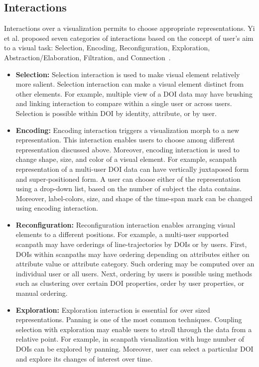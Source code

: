 \subsection{Interactions}
Interactions over a visualization permits to choose appropriate representations. Yi et al. proposed seven categories of interactions based on the concept of user's aim to a visual task: Selection, Encoding, Reconfiguration, Exploration, Abstraction/Elaboration, Filtration, and Connection~\cite{yi2007toward}. 

\begin{itemize}

	\item \textbf{Selection:} Selection interaction is used to make visual element relatively more salient. Selection interaction can make a visual element distinct from other elements. For example, multiple view of a DOI data may have brushing and linking interaction to compare within a single user or across users. Selection is possible within DOI by identity, attribute, or by user.
	
	\item \textbf{Encoding:} Encoding interaction triggers a visualization morph to a new representation. This interaction enables users to choose among different representation discussed above. Moreover, encoding interaction is used to change shape, size, and color of a visual element. For example, scanpath representation of a multi-user DOI data can have vertically juxtaposed form and super-positioned form. A user can choose either of the representation using a drop-down list, based on the number of subject the data contains. Moreover, label-colors, size, and shape of the time-span mark can be changed using encoding interaction. 
	
	\item \textbf{Reconfiguration:} Reconfiguration interaction enables arranging visual elements to a different positions. For example, a multi-user supported scanpath  may have orderings of line-trajectories by DOIs or by users. First, DOIs within scanpaths may have ordering depending on attributes either on attribute value or attribute category. Such ordering may be computed over an individual user or all users. Next, ordering by users is possible using methods such as clustering over certain DOI properties, order by user properties, or manual ordering.
	
	\item \textbf{Exploration:} Exploration interaction is essential for over sized representations. Panning is one of the most common techniques. Coupling selection with exploration may enable users to stroll through the data from a relative point. For example, in scanpath visualization with huge number of DOIs can be explored by panning. Moreover, user can select a particular DOI and explore its changes of interest over time. 
	

\end{itemize}
